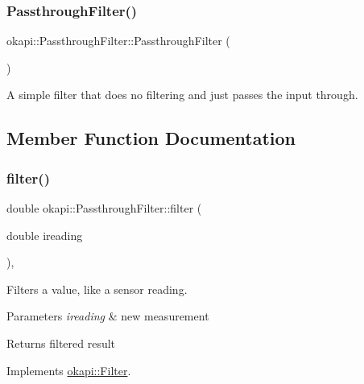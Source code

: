 \subsubsection{\texorpdfstring{PassthroughFilter()}{PassthroughFilter()}}
{\footnotesize\ttfamily okapi\+::\+Passthrough\+Filter\+::\+Passthrough\+Filter (\begin{DoxyParamCaption}{ }\end{DoxyParamCaption})\hspace{0.3cm}{\ttfamily [default]}}

A simple filter that does no filtering and just passes the input through. 

\subsection{Member Function Documentation}
\mbox{\label{classokapi_1_1PassthroughFilter_a359570b00c564dde65e02c6485079544}} 
\subsubsection{\texorpdfstring{filter()}{filter()}}
{\footnotesize\ttfamily double okapi\+::\+Passthrough\+Filter\+::filter (\begin{DoxyParamCaption}\item[{double}]{ireading }\end{DoxyParamCaption})\hspace{0.3cm}{\ttfamily [override]}, {\ttfamily [virtual]}}

Filters a value, like a sensor reading.


\begin{DoxyParams}{Parameters}
{\em ireading} & new measurement \\
\hline
\end{DoxyParams}
\begin{DoxyReturn}{Returns}
filtered result 
\end{DoxyReturn}


Implements \mbox{\hyperlink{classokapi_1_1Filter_a7c2ea0b64b37b688900189856d58da15}{okapi\+::\+Filter}}.

\mbox{\label{classokapi_1_1PassthroughFilter_a90bd8c34fa22bfc7c6f9f76fd6e655dc}} 
